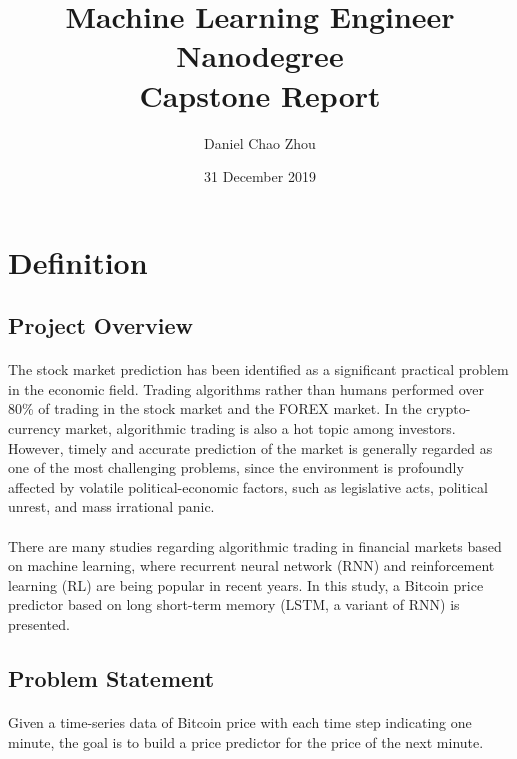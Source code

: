 \documentclass[12pt, letterpaper]{article}
\title{Machine Learning Engineer Nanodegree\\Capstone Report}
\author{Daniel Chao Zhou}
\date{31 December 2019}
\begin{document}
\maketitle

\section{Definition} %

\subsection{Project Overview}

\paragraph{}
The stock market prediction has been identified as a significant practical problem in the economic field. Trading algorithms rather than humans performed over 80\% of trading in the stock market and the FOREX market. In the crypto-currency market, algorithmic trading is also a hot topic among investors. However, timely and accurate prediction of the market is generally regarded as one of the most challenging problems, since the environment is profoundly affected by volatile political-economic factors, such as legislative acts, political unrest, and mass irrational panic.

\paragraph{}
There are many studies regarding algorithmic trading in financial markets based on machine learning, where recurrent neural network (RNN) and reinforcement learning (RL) are being popular in recent years. In this study, a Bitcoin price predictor based on long short-term memory (LSTM, a variant of RNN) is presented.

\subsection{Problem Statement}

\paragraph{}
Given a time-series data of Bitcoin price with each time step indicating one minute, the goal is to build a price predictor for the price of the next minute.
\end{document}
